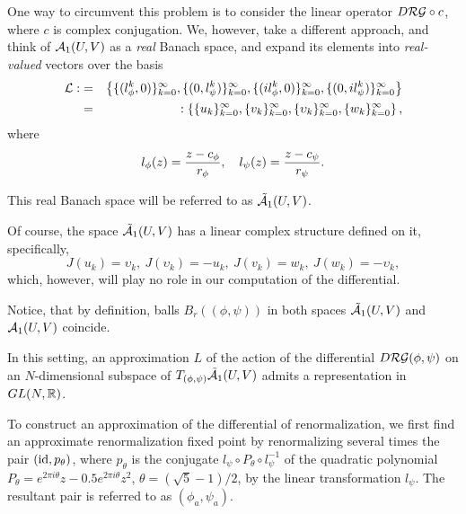 One way to circumvent this problem is to consider the linear operator $D \mathcal{RG} \circ c$, where $c$ is complex conjugation. We, however, take a different approach, and think of $\mathcal{A}_1(U,V)$ as a {\it real} Banach space, and expand its elements into
{\it real-valued} vectors over the basis
\begin{eqnarray}
\nonumber \mathcal{L}:&=&\left\{ \{ (l_\phi^k,0) \}_{k=0}^\infty,\{(0,l_\psi^k)\}_{k=0}^\infty,\{(i l_\phi^k,0)\}_{k=0}^\infty,\{(0,i l_\psi^k)\}_{k=0}^\infty \right\}\\
\nonumber &=&:\left\{ \{ u_k \}_{k=0}^\infty,\{v_k\}_{k=0}^\infty,\{\upsilon_k\}_{k=0}^\infty,\{w_k\}_{k=0}^\infty \right\},
\end{eqnarray}
where 
$$l_\phi(z)={z-c_\phi \over r_\phi}, \quad l_\psi(z)={z-c_\psi \over r_\psi}.$$

This real Banach space will be referred to as  $\tilde{\mathcal{A}}_1(U,V)$.

Of course, the space  $\tilde{\mathcal{A}}_1(U,V)$ has a linear complex structure defined on it, specifically, 
$$J(u_k)= \upsilon_k, \  J(\upsilon_k)= -u_k, \ J(v_k)= w_k, \  J(w_k)= -\upsilon_k,$$
which, however, will play no role in our computation of the differential.

Notice, that by definition, balls $B_r((\phi,\psi))$ in both spaces   $\tilde{\mathcal{A}}_1(U,V)$ and  $\mathcal{A}_1(U,V)$ coincide.

In this setting, an approximation $L$  of the action of the  differential $D \mathcal{RG}(\phi,\psi)$ on an $N$-dimensional subspace of  $T_{(\phi,\psi)} \tilde{\mathcal{A}}_1(U,V)$ admits a representation in $GL(N,\mathbb{R})$.

To construct an approximation of the differential of renormalization, we first find an  approximate renormalization fixed point by renormalizing several times the pair $({\rm id},p_\theta)$, where $p_\theta$ is the conjugate $ l_\psi \circ P_\theta \circ l_\psi^{-1} $ of the quadratic polynomial $P_\theta=e^{2 \pi i \theta} z  -0.5 e^{2 \pi i \theta} z^2$, $\theta=(\sqrt{5}-1)/2$, by the linear transformation $l_\psi$.  The resultant pair is referred to as $(\phi_a,\psi_a)$.

